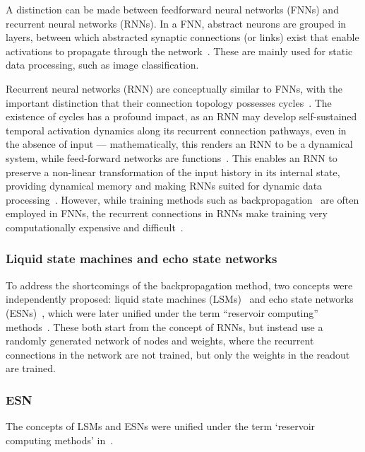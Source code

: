 A distinction can be made between feedforward neural networks (FNNs) and recurrent neural networks (RNNs).
In a FNN, abstract neurons are grouped in layers, between which abstracted synaptic connections (or links) exist that enable activations to propagate through the network~\cite{lukovsevivcius2009reservoir}.
These are mainly used for static data processing, such as image classification. \par

Recurrent neural networks (RNN) are conceptually similar to FNNs, with the important distinction that their connection topology possesses cycles~\cite{lukovsevivcius2009reservoir}.
The existence of cycles has a profound impact, as an RNN may develop self-sustained temporal activation dynamics along its recurrent connection pathways, even in the absence of input --- mathematically, this renders an RNN to be a dynamical system, while feed-forward networks are functions~\cite{lukovsevivcius2009reservoir}. %
This enables an RNN to preserve a non-linear transformation of the input history in its internal state, providing dynamical memory and making RNNs suited for dynamic data processing~\cite{lukovsevivcius2009reservoir,RC_RecentAdvances}.
However, while training methods such as backpropagation~\cite{Backpropagation} are often employed in FNNs, the recurrent connections in RNNs make training very computationally expensive and difficult~\cite{EvaluatingRestrictedESNs,Moon_2021,RC_SuperconductingElectronics}.

\subsubsection{Liquid state machines and echo state networks}
To address the shortcomings of the backpropagation method, two concepts were independently proposed: liquid state machines (LSMs)~\cite{maass_LSM} and echo state networks (ESNs)~\cite{jaeger2001echo}, which were later unified under the term ``reservoir computing'' methods~\cite{RC_unification}.
These both start from the concept of RNNs, but instead use a randomly generated network of nodes and weights, where the recurrent connections in the network are not trained, but only the weights in the readout are trained.


\subsubsection{ESN}
The concepts of LSMs and ESNs were unified under the term `reservoir computing methods' in~\cite{RC_unification}.
